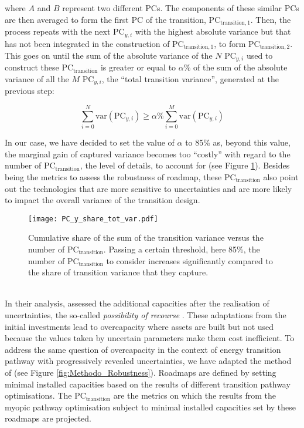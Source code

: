 \noindent
where $A$ and $B$ represent two different PCs.  The components of these similar PCs are then averaged to form the first PC of the transition, $\text{PC}_{\text{transition},1}$. Then, the process repeats with the next $\text{PC}_{y,i}$ with the highest absolute variance but that has not been integrated in the construction of $\text{PC}_{\text{transition},1}$, to form $\text{PC}_{\text{transition},2}$. This goes on until the sum of the absolute variance of the $N$ $\text{PC}_{y,i}$ used to construct these $\text{PC}_{\text{transition}}$ is greater or equal to $\alpha$\% of the sum of the absolute variance of all the $M$ $\text{PC}_{y,i}$, \ie the ``total transition variance'', generated at the previous step:

\begin{equation}
\label{eq:PC_transition}
\sum_{i=0}^N\text{var}\left(\text{PC}_{y,i}\right)\geq \alpha\% \sum_{i=0}^M\text{var}\left(\text{PC}_{y,i}\right)
\end{equation}

In our case, we have decided to set the value of $\alpha$ to 85\% as, beyond this value, the marginal gain of captured variance becomes too ``costly'' with regard to the number of $\text{PC}_{\text{transition}}$, \ie the level of details, to account for (see Figure \ref{fig:PC_y_share_tot_var}).  Besides being the metrics to assess the robustness of roadmap, these $\text{PC}_{\text{transition}}$ also point out the technologies that are more sensitive to uncertainties and are more likely to impact the overall variance of the transition design.

\begin{figure}[!htbp]
\centering
\texttt{[image: PC\_y\_share\_tot\_var.pdf]}
\caption{Cumulative share of the sum of the transition variance versus the number of $\text{PC}_{\text{transition}}$. Passing a certain threshold, here 85\%, the number of $\text{PC}_{\text{transition}}$ to consider increases significantly compared to the share of transition variance that they capture.}
\label{fig:PC_y_share_tot_var}
\end{figure}

\newpage
{}\\

\noindent
In their analysis, \citet{moret2020overcapacity} assessed the additional capacities after the realisation of uncertainties, the so-called \textit{possibility of recourse} \cite{grossmann2016recent}. These adaptations from the initial investments lead to overcapacity where assets are built but not used because the values taken by uncertain parameters make them cost inefficient. To address the same question of overcapacity in the context of energy transition pathway with progressively revealed uncertainties, we have adapted the method of \citet{moret2020overcapacity} (see Figure \ref{fig:Methodo_Robustness}). Roadmaps are defined by setting minimal installed capacities based on the results of different transition pathway optimisations. The $\text{PC}_{\text{transition}}$ are the metrics on which the results from the myopic pathway optimisation subject to minimal installed capacities set by these roadmaps are projected. 

